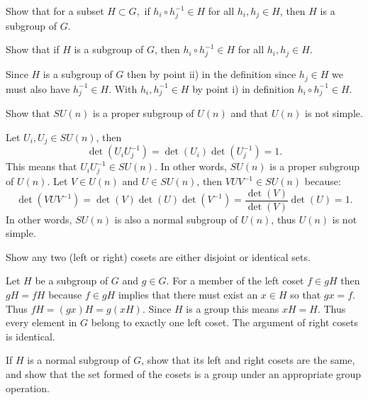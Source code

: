 \documentclass[notes.tex]{subfiles}
\begin{document}
\begin{Exercise}[]
Show that for a subset $H\subset G,$ if $h_i \circ h_j^{-1} \in H$ for all $h_i, h_j\in H$, then $H$ is a subgroup of $G$.
\end{Exercise}
\begin{Answer}
\end{Answer}

\begin{Exercise}[]
Show that if $H$ is a subgroup of $G$, then $h_i \circ h_j^{-1} \in H$ for all $h_i, h_j\in H$.
\end{Exercise}
\begin{Answer}
Since $H$ is a subgroup of $G$ then by point ii) in the definition since $h_j\in H$ we must also have $h_j^{-1} \in H$. With $h_i, h_j^{-1} \in H$ by point i) in definition $h_i  \circ h_j^{-1} \in H$.
\end{Answer}

\begin{Exercise}[label=ex:SUn_normal]
Show that $SU(n)$ is a proper subgroup of $U(n)$ and that $U(n)$ is not simple.
\end{Exercise}

\begin{Answer}
Let $U_i, U_j \in SU(n)$, then 
\[\det(U_i U_j^{-1}) = \det(U_i)\det(U_j^{-1}) = 1.\]
This means that $U_i U^{-1}_j \in SU(n)$. In other words, $SU(n)$ is a proper subgroup of $U(n)$. Let $V \in U(n)$ and $U \in SU(n)$, then $VUV^{-1} \in SU(n)$ because:
\[\det(VUV^{-1}) = \det(V)\det(U)\det(V^{-1}) = \frac{\det(V)}{\det(V)} \det(U) = 1.\]
In other words, $SU(n)$ is also a normal subgroup of $U(n)$, thus $U(n)$ is not simple.
\end{Answer}

\begin{Exercise}
Show any two (left or right) cosets are either disjoint or identical sets.
\end{Exercise}
\begin{Answer}
Let $H$ be a subgroup of $G$ and $g\in G$. For a member of the left coset $f\in gH$ then $gH=fH$ because $f\in gH$ implies that there must exist an $x\in H$ so that $gx=f$. Thus $fH=(gx)H=g(xH)$. Since $H$ is a group this means $xH=H$.  Thus every element in $G$ belong to exactly one left coset. The argument of right cosets is identical.
\end{Answer}

\begin{Exercise}[]
If $H$ is a normal subgroup of $G$, show that its left and right cosets are the same, and show that the set formed of the cosets is a group under an appropriate group operation.
\end{Exercise}
\end{document}
